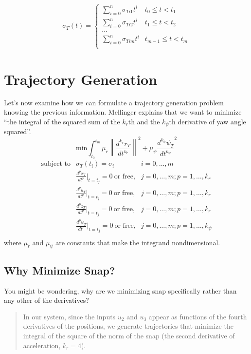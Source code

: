 \documentclass{article}
\newcommand{\norm}[1]{\left\lVert#1\right\rVert}
\begin{document}
\begin{align}\label{eq:polynomial}
\sigma_T(t) =
\left\{
	\begin{array}{ll}
		\sum_{i=0}^n \sigma_{Ti1} t^i  & t_0 \leq t < t_1 \\
		\sum_{i=0}^n \sigma_{Ti2} t^i  & t_1 \leq t < t_2 \\
		... \\
		\sum_{i=0}^n \sigma_{Tim} t^i  & t_{m-1} \leq t < t_m \\
	\end{array}
\right.
\end{align}

\section{Trajectory Generation}

Let's now examine how we can formulate a trajectory generation problem knowing the previous information. Mellinger explains that we want to minimize ``the integral of the squared sum of the $k_r$th and the $k_\psi$th derivative of yaw angle squared''.
\[
\text{min} \int_{t_0}^{t_m} \mu_r \norm{\frac{d^{k_r} r_T}{dt^{k_r}}}^2 + \mu_\psi \frac{d^{k_\psi} \psi_T}{dt^{k_\psi}}^2
\]
\[
	\begin{array}{lll}
		\text{subject to} & \sigma_T(t_i) = \sigma_i & i = 0, \ldots, m\\
		& \frac{d^p x_T}{dt^p}|_{t=t_j} = 0\ \text{or free,} & j = 0, \ldots, m; p = 1, \ldots, k_r\\
		& \frac{d^p y_T}{dt^p}|_{t=t_j} = 0\ \text{or free,} & j = 0, \ldots, m; p = 1, \ldots, k_r\\
		& \frac{d^p z_T}{dt^p}|_{t=t_j} = 0\ \text{or free,} & j = 0, \ldots, m; p = 1, \ldots, k_r\\
		& \frac{d^p \psi_T}{dt^p}|_{t=t_j} = 0\ \text{or free,} & j = 0, \ldots, m; p = 1, \ldots, k_\psi\\
	\end{array}
\]
where $\mu_r$ and $\mu_\psi$ are constants that make the integrand nondimensional.

\subsection{Why Minimize Snap?}
You might be wondering, why are we minimizing snap specifically rather than any other of the derivatives? 

\begin{quotation}
In our system, since the inputs $u_2$ and $u_3$ appear as functions of the fourth derivatives of the positions, we generate trajectories that minimize the integral of the square of the norm of the snap (the second derivative of acceleration, $k_r = 4$).
\end{quotation}
\end{document}
